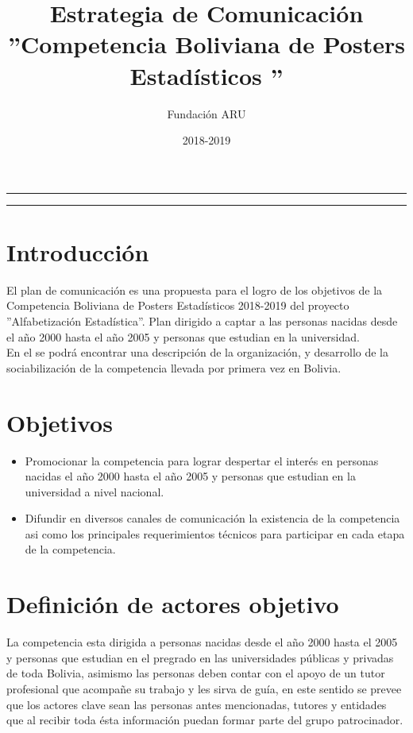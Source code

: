 \documentclass{article}
\title{\textbf{Estrategia de Comunicación} \\ ''Competencia Boliviana de Posters Estadísticos ''}
\author{Fundación ARU}
\date{2018-2019 }
\begin{document}
\maketitle

\hrule
\hrule
\newpage

\section{Introducción}

El plan de comunicación es una propuesta para el logro de los objetivos de la Competencia Boliviana de Posters Estadísticos 2018-2019 del proyecto ''Alfabetización Estadística''. Plan dirigido a captar a las personas nacidas desde el año 2000 hasta el año 2005 y personas que estudian en la universidad.\\

En el se podrá encontrar una descripción de la organización, y desarrollo de la sociabilización de la competencia llevada por primera vez en Bolivia.


\section{Objetivos}

\begin{itemize}
\item Promocionar la competencia para lograr despertar el interés en personas nacidas el año 2000 hasta el año 2005 y personas que estudian en la universidad a nivel nacional. 

\item Difundir en diversos canales de comunicación la existencia de la competencia asi como los principales requerimientos técnicos para participar en cada etapa de la competencia.
\end{itemize} 

\section{Definición de actores objetivo}

La competencia esta dirigida a personas nacidas desde el año 2000 hasta el 2005 y personas que estudian en el pregrado en las universidades públicas y privadas de toda Bolivia, asimismo las personas deben contar con el apoyo de un tutor profesional que acompañe su trabajo y les sirva de guía, en este sentido se prevee que los actores clave sean las personas antes mencionadas, tutores y entidades que al recibir toda ésta información puedan formar parte del grupo patrocinador.
\end{document}
